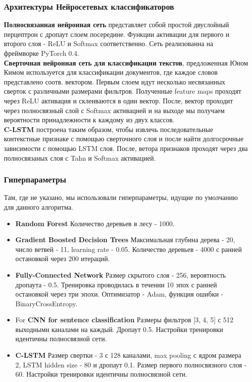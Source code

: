 \subsubsection{Архитектуры Нейросетевых классификаторов}
{\bf Полносвязанная нейронная сеть} представляет собой простой двуслойный перцептрон с дропаут слоем посередине. Функции активации для первого и второго слоя - ReLU и Softmax соответственно. Сеть реализованна на фреймворке PyTorch 0.4.\\
{\bf Сверточная нейронная сеть для классификации текстов}, предложенная Юном Кимом используется для классификации документов, где каждое словов представлено соотв. вектором. Первым слоем идут несколько несвязанных сверток с различными размерами фильтров. Полученные feature maps проходят через ReLU активация и склеиваются в один вектор. После, вектор проходит через полносвязный слой с Softmax активацией и на выходе мы получаем вероятности принадлежности к каждому из двух классов. \\
{\bf C-LSTM} построена таким образом, чтобы извлечь последовательные контекстные признаке с помощью сверточного слоя и после найти долгосрочные зависимости с помощью LSTM слоя. После, ветора признаков проходят через два полносвязаных слоя с Tahn и Softmax активацией.

\subsubsection{Гиперпараметры}
Там, где не указано, мы использовали гиперпараметры, идущие по умолчанию для данного алгоритма.
\begin{itemize}
		\item {\bf Random Forest} Количество деревьев в лесу - 1000.
		\item {\bf Gradient Boosted Decision Trees} Максимальная глубина дерева - 20, число ветвей - 11, learning rate - 0.05.  Количество деревьев - 4000 с ранней остановкой через 200 итераций.
		\item {\bf Fully-Connected Network} Размер скрытого слоя - 256, вероятность дропаута -  0.5. Тренировка проводилась в течении 10 эпох с ранней остановкой через три эпохи. Оптимизатор - Adam, функция ошибки -  BinaryCrossEntropy.
		\item For {\bf CNN for sentence classification} Размеры фильтров [3, 4, 5] с 512 выходными каналами на каждый. Дропаут 0.5. Настройки тренировки идентичны полносвязной сети.
		\item {\bf C-LSTM} Размер свертки - 3 с 128 каналами, max pooling с ядром размера 2, LSTM hidden size - 80 и дропаут 0.1. Размер первого полносвязного слоя - 60. Настройки тренировки идентичны полносвязной сети.
\end{itemize}


